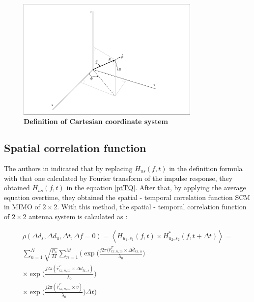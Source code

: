 \documentclass{article} %
\begin{document}
\begin{figure}[htbp]
    \centering
    \includegraphics[width=0.8\textwidth, clip, trim=5 5 5 5]{Figure 7.1.1.pdf}
    \caption[Definition of Cartesian coordinate system~\cite{ETSI5G}]{\bfseries \fontsize{12pt}{0pt}\selectfont Definition of Cartesian coordinate system~\cite{ETSI5G}}
    \label{coordinate}
\end{figure}

\subsection{Spatial correlation function}

The authors in \cite{scm_onering} indicated that by replacing $H_{us}(f,t)$ in the definition formula with that one calculated by Fourier transform of the impulse response, they obtained $H_{us}(f,t)$ in the equation \ref{ptTQ}. After that, by applying the average equation overtime, they obtained the spatial - temporal correlation function SCM in MIMO of $2 \times 2$. With this method, the spatial - temporal correlation function of $2 \times 2$ antenna system is calculated as \cite{final_exam}:

\begin{adjustwidth}{-2cm}{0cm}
\begin{equation} \label{ptTQ}
\begin{split}
    \rho(\Delta d_s, \Delta d_u, \Delta t, \Delta f = 0)=\left\langle H_{u_1, s_1}(f,t) \times H_{u_2, s_2}^* (f,t+\Delta t) \right\rangle = \\
    \sum_{n=1}^{N}\sqrt{\frac{P_n}{M}}\sum_{n=1}^M
    \Bigg(
    \exp \Big( \frac{j2\pi(\hat{r}_{rx,n,m}^T \times \Delta \overline d_{rx,u}}{\lambda_0} \Big) \\
    \times \exp \Big( \frac{j2\pi(\hat{r}_{rx,n,m}^T \times \Delta \overline d_{tx,s})}{\lambda_0} \Big) \\
    \times \exp \Big( \frac{j2\pi(\hat{r}_{rx,n,m}^T \times \overline{v})}{\lambda_0} \Big)\Delta t
    \Bigg)
\end{split}
\end{equation}
\end{adjustwidth}
\end{document}
